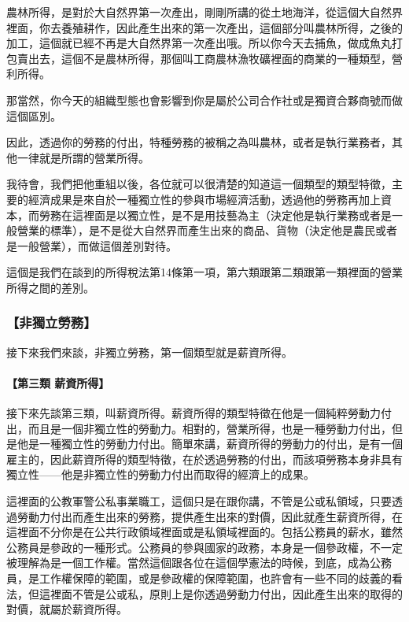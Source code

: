 \documentclass[oneside,sub3section]{ctexbook}
\let\oldparagraph\paragraph
\renewcommand{\paragraph}[1]{\oldparagraph{#1}\mbox{}}
\begin{document}
農林所得，是對於大自然界第一次產出，剛剛所講的從土地海洋，從這個大自然界裡面，你去養殖耕作，因此產生出來的第一次產出，這個部分叫農林所得，之後的加工，這個就已經不再是大自然界第一次產出哦。所以你今天去捕魚，做成魚丸打包賣出去，這個不是農林所得，那個叫工商農林漁牧礦裡面的商業的一種類型，營利所得。

那當然，你今天的組織型態也會影響到你是屬於公司合作社或是獨資合夥商號而做這個區別。

因此，透過你的勞務的付出，特種勞務的被稱之為叫農林，或者是執行業務者，其他一律就是所謂的營業所得。

我待會，我們把他重組以後，各位就可以很清楚的知道這一個類型的類型特徵，主要的經濟成果是來自於一種獨立性的參與市場經濟活動，透過他的勞務再加上資本，而勞務在這裡面是以獨立性，是不是用技藝為主（決定他是執行業務或者是一般營業的標準），是不是從大自然界而產生出來的商品、貨物（決定他是農民或者是一般營業），而做這個差別對待。

這個是我們在談到的所得稅法第14條第一項，第六類跟第二類跟第一類裡面的營業所得之間的差別。

\hypertarget{ux975eux7368ux7acbux52deux52d9}{%
\subsubsection{【非獨立勞務】}\label{ux975eux7368ux7acbux52deux52d9}}

接下來我們來談，非獨立勞務，第一個類型就是薪資所得。

\hypertarget{ux7b2cux4e09ux985e-ux85aaux8cc7ux6240ux5f97}{%
\paragraph{【第三類 薪資所得】}\label{ux7b2cux4e09ux985e-ux85aaux8cc7ux6240ux5f97}}

接下來先談第三類，叫薪資所得。薪資所得的類型特徵在他是一個純粹勞動力付出，而且是一個非獨立性的勞動力。相對的，營業所得，也是一種勞動力付出，但是他是一種獨立性的勞動力付出。簡單來講，薪資所得的勞動力的付出，是有一個雇主的，因此薪資所得的類型特徵，在於透過勞務的付出，而該項勞務本身非具有獨立性------他是非獨立性的勞動力付出而取得的經濟上的成果。

這裡面的公教軍警公私事業職工，這個只是在跟你講，不管是公或私領域，只要透過勞動力付出而產生出來的勞務，提供產生出來的對價，因此就產生薪資所得，在這裡面不分你是在公共行政領域裡面或是私領域裡面的。包括公務員的薪水，雖然公務員是參政的一種形式。公務員的參與國家的政務，本身是一個參政權，不一定被理解為是一個工作權。當然這個跟各位在這個學憲法的時候，到底，成為公務員，是工作權保障的範圍，或是參政權的保障範圍，也許會有一些不同的歧義的看法，但這裡面不管是公或私，原則上是你透過勞動力付出，因此產生出來的取得的對價，就屬於薪資所得。
\end{document}

